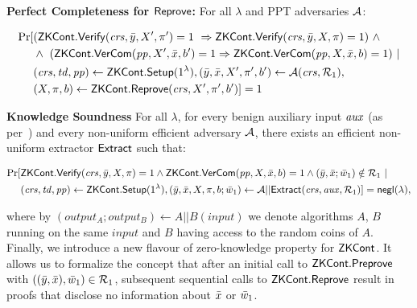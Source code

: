 \begin{definition}[ZK Continuation]
\begin{footnotesize}
\end{footnotesize}

\noindent \textbf{Perfect Completeness for ${\mathsf{Reprove}}$:} For all $\lambda$ and PPT adversaries $\mathcal{A}$: 
\begin{footnotesize}
\begin{align*}
\Pr [& ({\mathsf{ZKCont}}.{\mathsf{Verify}}(\mathit{crs}, \bar{y}, X', \pi') = 1 \  \Rightarrow {\ensuremath{\mathsf{ZKCont}}}.{\mathsf{Verify}}(\mathit{crs}, \bar{y}, X, \pi) = 1)  \ \wedge \ \\
                   &\wedge \ ({\mathsf{ZKCont}}.{\mathsf{VerCom}} (\mathit{pp}, X', \bar{x}, b') = 1  \Rightarrow  {\ensuremath{\mathsf{ZKCont}}}.{\mathsf{VerCom}} (\mathit{pp}, X, \bar{x}, b) = 1) \ | \\
                   & (\mathit{crs}, \mathit{td}, \mathit{pp}) \leftarrow {\ensuremath{\mathsf{ZKCont}}}.{\mathsf{Setup}} (1^{\lambda}),  (\bar{y}, \bar{x}, X', \pi', b') \leftarrow \mathcal{A}(\mathit{crs},\mathcal{R}_1), \\
                   & (X, \pi, b) \leftarrow {\ensuremath{\mathsf{ZKCont}}}.{\mathsf{Reprove}}(\mathit{crs}, X', \pi', b')] = 1
\end{align*}
\end{footnotesize}

\noindent \textbf{Knowledge Soundness} For all $\lambda$, for every benign auxiliary input $\mathit{aux}$ (as per~\cite{bening_auxiliary}) and 
every non-uniform efficient adversary $\mathcal{A}$, there exists an efficient non-uniform extractor  $ {\mathsf{Extract}} $ such that:
\begin{footnotesize}
\begin{align*}
\Pr [& {\mathsf{ZKCont}}.{\mathsf{Verify}}(\mathit{crs}, \bar{y}, X, \pi) = 1  \wedge {\ensuremath{\mathsf{ZKCont}}}.{\mathsf{VerCom}}(\mathit{pp}, X, \bar{x}, b) = 1  \wedge (\bar{y}, \bar{x}; \bar{w}_1) \notin \mathcal{R}_1\ | \\
                   & (\mathit{crs}, \mathit{td}, \mathit{pp}) \leftarrow {\ensuremath{\mathsf{ZKCont}}}.{\mathsf{Setup}} (1^{\lambda}), (\bar{y}, \bar{x}, X, \pi, b; \bar{w}_1 ) \leftarrow \mathcal{A} || {\mathsf{Extract}}(\mathit{crs}, \mathit{aux}, \mathcal{R}_1)] = \mathsf{negl} (\lambda),
\end{align*}
\end{footnotesize}

\noindent where by $(\mathit{output_{A}};\mathit{output_{B}}) \leftarrow A || B(\mathit{input})$ we denote algorithms $A$, $B$ running on the same 
$\mathit{input}$ and $B$ having access to the random coins of $A$. \\

 Finally, we introduce a new flavour of zero-knowledge property for $ {\mathsf{ZKCont}} $. It allows us to formalize the concept that after an initial call to ${\mathsf{ZKCont}}.{\mathsf{Preprove}}$ with $((\bar{y}, \bar{x}), \bar{w}_1) \in \mathcal{R}_1$, subsequent sequential calls to $ {\mathsf{ZKCont}}.{\mathsf{Reprove}} $ result in proofs that disclose no information about $\bar{x}$ or $\bar{w}_1$.



\end{definition}
